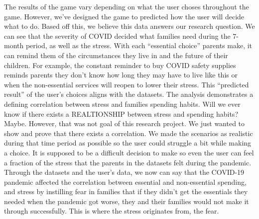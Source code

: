 \documentclass[fontsize=11pt]{article}
\begin{document}
    The results of the game vary depending on what the user choses throughout the game. However, we’ve designed the game to predicted how the user will decide what to do. Based off this, we believe this data answers our research question. We can see that the severity of COVID decided what families need during the 7-month period, as well as the stress. With each “essential choice” parents make, it can remind them of the circumstances they live in and the future of their children. For example, the constant reminder to buy COVID safety supplies reminds parents they don’t know how long they may have to live like this or when the non-essential services will reopen to lower their stress. This “predicted result” of the user’s choices aligns with the datasets. The analysis demonstrates a defining correlation between stress and families spending habits. Will we ever know if there exists a REALTIONSHIP between stress and spending habits? Maybe. However, that was not goal of this research project. We just wanted to show and prove that there exists a correlation. We made the scenarios as realistic during that time period as possible so the user could struggle a bit while making a choice. It is supposed to be a difficult decision to make so even the user can feel a fraction of the stress that the parents in the datasets felt during the pandemic. Through the datasets and the user’s data, we now can say that the COVID-19 pandemic affected the correlation between essential and non-essential spending, and stress by instilling fear in families that if they didn’t get the essentials they needed when the pandemic got worse, they and their families would not make it through successfully. This is where the stress originates from, the fear.
\end{document}
